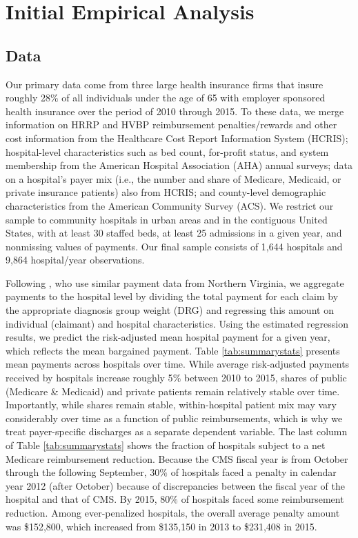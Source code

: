 \documentclass[12pt]{article}
\begin{document}
\section{Initial Empirical Analysis}
\label{sec:Empirical}


\subsection{Data}
Our primary data come from three large health insurance firms that insure roughly 28$\%$ of all individuals under the age of 65 with employer sponsored health insurance over the period of 2010 through 2015.  To these data, we merge information on HRRP and HVBP reimbursement penalties/rewards and other cost information from the Healthcare Cost Report Information System (HCRIS); hospital-level characteristics such as bed count, for-profit status, and system membership from the American Hospital Association (AHA) annual surveys; data on a hospital's payer mix (i.e., the number and share of Medicare, Medicaid, or private insurance patients) also from HCRIS; and county-level demographic characteristics from the American Community Survey (ACS).  We restrict our sample to community hospitals in urban areas and in the contiguous United States, with at least 30 staffed beds, at least 25 admissions in a given year, and nonmissing values of payments.  Our final sample consists of 1,644 hospitals and 9,864 hospital/year observations.

Following \citet{gowrisankaran2015}, who use similar payment data from Northern Virginia, we aggregate payments to the hospital level by dividing the total payment for each claim by the appropriate diagnosis group weight (DRG) and regressing this amount on individual (claimant) and hospital characteristics.  Using the estimated regression results, we predict the risk-adjusted mean hospital payment for a given year, which reflects the mean bargained payment. Table \ref{tab:summarystats} presents mean payments across hospitals over time. While average risk-adjusted payments received by hospitals increase roughly 5$\%$ between 2010 to 2015, shares of public (Medicare \& Medicaid) and private patients remain relatively stable over time.  Importantly, while shares remain stable, within-hospital patient mix may vary considerably over time as a function of public reimbursements, which is why we treat payer-specific discharges as a separate dependent variable.  The last column of Table \ref{tab:summarystats} shows the fraction of hospitals subject to a net Medicare reimbursement reduction.  Because the CMS fiscal year is from October through the following September, 30$\%$ of hospitals faced a penalty in calendar year 2012 (after October) because of discrepancies between the fiscal year of the hospital and that of CMS.  By 2015, 80$\%$ of hospitals faced some reimbursement reduction. Among ever-penalized hospitals, the overall average penalty amount was \$152,800, which increased from \$135,150 in 2013 to \$231,408 in 2015.
\end{document}
